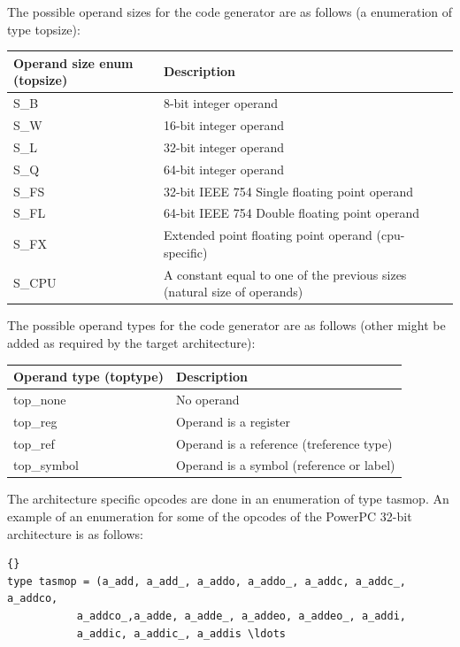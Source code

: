 \documentclass [12pt]{article}
\begin{document}
The possible operand sizes for the code generator are as follows (a 
enumeration of type \textsf{topsize}):

\begin{longtable}{|l|p{10cm}|}
\hline
Operand size enum (\textsf{topsize}) & Description \\
\hline
\endhead
\hline
\endfoot
\textsf{S{\_}B}& 			8-bit integer operand \\
\textsf{S{\_}W}& 			16-bit integer operand \\
\textsf{S{\_}L}& 			32-bit integer operand \\
\textsf{S{\_}Q}& 			64-bit integer operand \\
\textsf{S{\_}FS}& 			32-bit IEEE 754 Single floating point operand \\
\textsf{S{\_}FL}& 			64-bit IEEE 754 Double floating point operand \\
\textsf{S{\_}FX}& 			Extended point floating point operand (cpu-specific) \\
\textsf{S{\_}CPU}&			A constant equal to one of the previous sizes (natural size of operands) \\
\end{longtable}

The possible operand types for the code generator are as follows (other 
might be added as required by the target architecture):

\begin{longtable}{|l|p{10cm}|}
\hline
Operand type (\textsf{toptype}) & Description \\
\hline
\endhead
\hline
\endfoot
\textsf{top{\_}none}& 			No operand \\
\textsf{top{\_}reg}& 			Operand is a register \\
\textsf{top{\_}ref}& 			Operand is a reference (\textsf{treference} type) \\
\textsf{top{\_}symbol}& 		Operand is a symbol (reference or label) \\
\end{longtable}

The architecture specific opcodes are done in an enumeration of type 
\textsf{tasmop}. An example of an enumeration for some of the opcodes of the 
PowerPC 32-bit architecture is as follows:

\begin{lstlisting}{}
type tasmop = (a_add, a_add_, a_addo, a_addo_, a_addc, a_addc_, a_addco,
	       a_addco_,a_adde, a_adde_, a_addeo, a_addeo_, a_addi, 
	       a_addic, a_addic_, a_addis \ldots 
\end{lstlisting}
\end{document}
